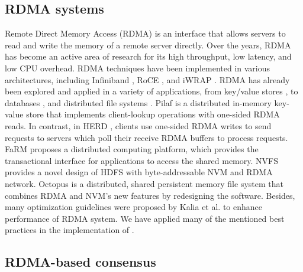 \subsection{RDMA systems}
\label{sec:rwrdmasys}

Remote Direct Memory Access (RDMA) \cite{kalia2016design} is an interface that
allows servers to read and write the memory of a remote server directly. Over
the years, RDMA has become an active area of research for its high throughput,
low latency, and low CPU overhead. RDMA techniques have been implemented in
various architectures, including Infiniband \cite{pfister2001introduction}, RoCE
\cite{beck2011performance}, and iWRAP \cite{rashti200710}. RDMA has already been
explored and applied in a variety of applications, from key/value stores
\cite{FaRM, kalia2014using, mitchell2013using, wei2015fast}, to databases
\cite{binnig2015end, huang2019rdma}, and distributed file systems
\cite{islam2012high, li2009early, wu2003pvfs}. Pilaf \cite{mitchell2013using} is
a distributed in-memory key-value store that implements client-lookup operations
with one-sided RDMA reads. In contrast, in HERD \cite{kalia2014using}, clients use
one-sided RDMA writes to send requests to servers which poll their receive RDMA
buffers to process requests. FaRM \cite{FaRM} proposes a distributed computing
platform, which provides the transactional interface for applications to access
the shared memory. NVFS \cite{islam2012high} provides a novel design of HDFS
with byte-addressable NVM and RDMA network. Octopus \cite{lu2017octopus} is a
distributed, shared persistent memory file system that combines RDMA and NVM's
new features by redesigning the software. Besides, many optimization guidelines
were proposed by Kalia et al. \cite{kalia2016design} to enhance performance of
RDMA system. 
We have applied many of the mentioned best practices
in the implementation of \libname.


\subsection{RDMA-based consensus}
\label{sec:rwrdmacons}


